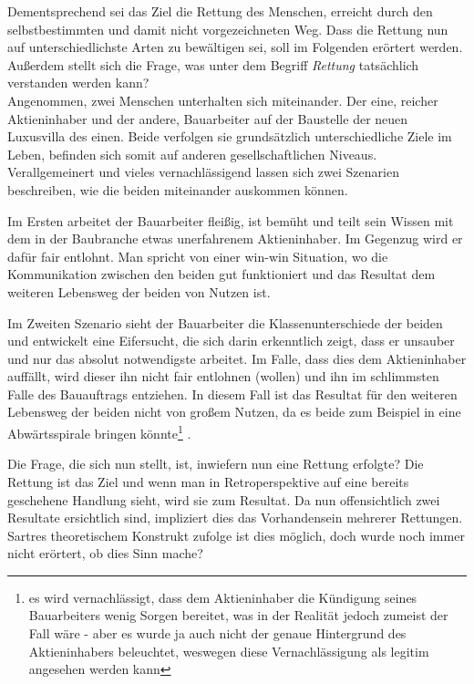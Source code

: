 \documentclass[12pt,a4paper,oneside]{article}
\begin{document}
  Dementsprechend sei das Ziel die Rettung des Menschen, erreicht durch den selbstbestimmten und damit nicht vorgezeichneten Weg. Dass die Rettung nun auf unterschiedlichste Arten zu bewältigen sei, soll im Folgenden erörtert werden. Außerdem stellt sich die Frage, was unter dem Begriff \textit{Rettung} tatsächlich verstanden werden kann? \\
  
  Angenommen, zwei Menschen unterhalten sich miteinander. Der eine, reicher Aktieninhaber und der andere, Bauarbeiter auf der Baustelle der neuen Luxusvilla des einen. Beide verfolgen sie grundsätzlich unterschiedliche Ziele im Leben, befinden sich somit auf anderen gesellschaftlichen Niveaus. Verallgemeinert und vieles vernachlässigend lassen sich zwei Szenarien beschreiben, wie die beiden miteinander auskommen können. 
  
  Im Ersten arbeitet der Bauarbeiter fleißig, ist bemüht und teilt sein Wissen mit dem in der Baubranche etwas unerfahrenem Aktieninhaber. Im Gegenzug wird er dafür fair entlohnt. Man spricht von einer win-win Situation, wo die Kommunikation zwischen den beiden gut funktioniert und das Resultat dem weiteren Lebensweg der beiden von Nutzen ist. 
  
  Im Zweiten Szenario sieht der Bauarbeiter die Klassenunterschiede der beiden und entwickelt eine Eifersucht, die sich darin erkenntlich zeigt, dass er unsauber und nur das absolut notwendigste arbeitet. Im Falle, dass dies dem Aktieninhaber auffällt, wird dieser ihn nicht fair entlohnen (wollen) und ihn im schlimmsten Falle des Bauauftrags entziehen. In diesem Fall ist das Resultat für den weiteren Lebensweg der beiden nicht von großem Nutzen, da es beide zum Beispiel in eine Abwärtsspirale bringen könnte\footnote{es wird vernachlässigt, dass dem Aktieninhaber die Kündigung seines Bauarbeiters wenig Sorgen bereitet, was in der Realität jedoch zumeist der Fall wäre - aber es wurde ja auch nicht der genaue Hintergrund des Aktieninhabers beleuchtet, weswegen diese Vernachlässigung als legitim angesehen werden kann} .
  
  Die Frage, die sich nun stellt, ist, inwiefern nun eine Rettung erfolgte? Die Rettung ist das Ziel und wenn man in Retroperspektive auf eine bereits geschehene Handlung sieht, wird sie zum Resultat. Da nun offensichtlich zwei Resultate ersichtlich sind, impliziert dies das Vorhandensein mehrerer Rettungen. Sartres theoretischem Konstrukt zufolge ist dies möglich, doch wurde noch immer nicht erörtert, ob dies Sinn mache? \\
  
\end{document}
